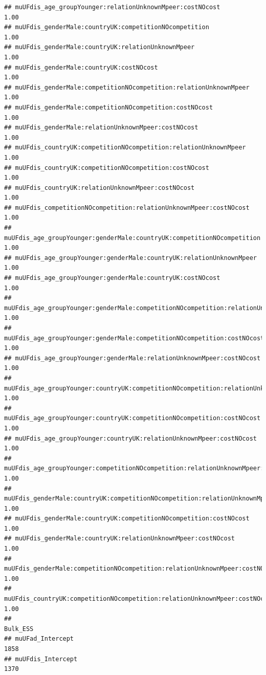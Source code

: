 \documentclass[
]{article}
\begin{document}
\begin{verbatim}
## muUFdis_age_groupYounger:relationUnknownMpeer:costNOcost                          1.00
## muUFdis_genderMale:countryUK:competitionNOcompetition                             1.00
## muUFdis_genderMale:countryUK:relationUnknownMpeer                                 1.00
## muUFdis_genderMale:countryUK:costNOcost                                           1.00
## muUFdis_genderMale:competitionNOcompetition:relationUnknownMpeer                  1.00
## muUFdis_genderMale:competitionNOcompetition:costNOcost                            1.00
## muUFdis_genderMale:relationUnknownMpeer:costNOcost                                1.00
## muUFdis_countryUK:competitionNOcompetition:relationUnknownMpeer                   1.00
## muUFdis_countryUK:competitionNOcompetition:costNOcost                             1.00
## muUFdis_countryUK:relationUnknownMpeer:costNOcost                                 1.00
## muUFdis_competitionNOcompetition:relationUnknownMpeer:costNOcost                  1.00
## muUFdis_age_groupYounger:genderMale:countryUK:competitionNOcompetition            1.00
## muUFdis_age_groupYounger:genderMale:countryUK:relationUnknownMpeer                1.00
## muUFdis_age_groupYounger:genderMale:countryUK:costNOcost                          1.00
## muUFdis_age_groupYounger:genderMale:competitionNOcompetition:relationUnknownMpeer 1.00
## muUFdis_age_groupYounger:genderMale:competitionNOcompetition:costNOcost           1.00
## muUFdis_age_groupYounger:genderMale:relationUnknownMpeer:costNOcost               1.00
## muUFdis_age_groupYounger:countryUK:competitionNOcompetition:relationUnknownMpeer  1.00
## muUFdis_age_groupYounger:countryUK:competitionNOcompetition:costNOcost            1.00
## muUFdis_age_groupYounger:countryUK:relationUnknownMpeer:costNOcost                1.00
## muUFdis_age_groupYounger:competitionNOcompetition:relationUnknownMpeer:costNOcost 1.00
## muUFdis_genderMale:countryUK:competitionNOcompetition:relationUnknownMpeer        1.00
## muUFdis_genderMale:countryUK:competitionNOcompetition:costNOcost                  1.00
## muUFdis_genderMale:countryUK:relationUnknownMpeer:costNOcost                      1.00
## muUFdis_genderMale:competitionNOcompetition:relationUnknownMpeer:costNOcost       1.00
## muUFdis_countryUK:competitionNOcompetition:relationUnknownMpeer:costNOcost        1.00
##                                                                                   Bulk_ESS
## muUFad_Intercept                                                                      1858
## muUFdis_Intercept                                                                     1370

\end{verbatim}
\end{document}
